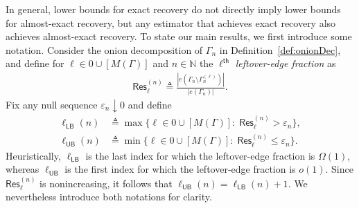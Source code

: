 \documentclass[12pt]{article}
\newcommand{\s}[1]{\mathsf{#1}}
\begin{document}
In general, lower bounds for exact recovery do not directly imply lower bounds for almost-exact recovery, but any estimator that achieves exact recovery also achieves almost-exact recovery. To state our main results, we first introduce some notation. Consider the onion decomposition of $\Gamma_n$ in Definition~\ref{def:onionDec}, and define for $\ell\in0\cup[M(\Gamma)]$ and $n\in\mathbb{N}$ the $\ell^{\s{th}}$ \emph{leftover-edge fraction} as
\begin{align}
\s{Res}_\ell^{(n)}\triangleq\frac{|e(\Gamma_n\setminus \Gamma_n^{(\ell)})|}{|e(\Gamma_n)|}.
\end{align}
Fix any null sequence $\varepsilon_n\downarrow 0$ and define
\begin{align}
\ell_{\s{LB}}(n)&\triangleq\max\{\ell\in0\cup[M(\Gamma)]:\; \s{Res}_\ell^{(n)}>\varepsilon_n\},\label{eqn:ellLB}\\
\ell_{\s{UB}}(n)&\triangleq\min\{\ell\in0\cup[M(\Gamma)]:\; \s{Res}_\ell^{(n)}\le \varepsilon_n\}.\label{eqn:ellUB}
\end{align}
Heuristically, $\ell_{\s{LB}}$ is the last index for which the leftover-edge fraction is $\Omega(1)$, whereas $\ell_{\s{UB}}$ is the first index for which the leftover-edge fraction is $o(1)$. Since $\s{Res}_\ell^{(n)}$ is nonincreasing, it follows that $\ell_{\s{UB}}(n) = \ell_{\s{LB}}(n)+1$. We nevertheless introduce both notations for clarity.
\end{document}
